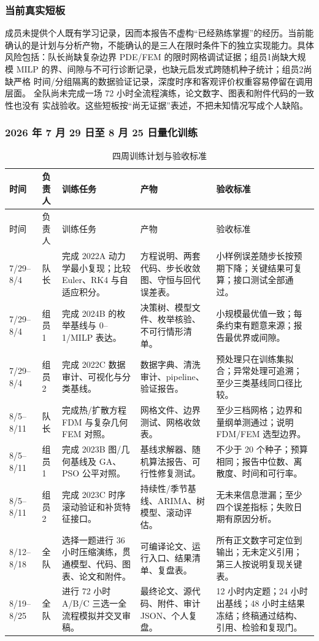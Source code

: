 \documentclass[UTF8,a4paper,12pt]{ctexart}
\begin{document}
\subsubsection{当前真实短板}

成员未提供个人既有学习记录，因而本报告不虚构“已经熟练掌握”的经历。当前能
确认的是计划与分析产物，不能确认的是三人在限时条件下的独立实现能力。具体
风险包括：队长尚缺复杂边界 PDE/FEM 的限时网格调试证据；组员1尚缺大规模
MILP 的界、间隙与不可行诊断记录，也缺元启发式跨随机种子统计；组员2尚缺严格
时间/分组隔离的数据验证记录，深度时序和客观评价权重容易停留在调用层面。
全队尚未完成一场 72 小时全流程演练，论文数字、图表和附件代码的一致性也没有
实战验收。这些短板按“尚无证据”表述，不把未知情况写成个人缺陷。

\subsubsection{2026 年 7 月 29 日至 8 月 25 日量化训练}

\begin{longtable}{p{1.4cm}p{1.55cm}p{3.1cm}p{4.6cm}p{3.4cm}}
\caption{四周训练计划与验收标准}\label{tab:four-weeks}\\
\toprule
时间 & 负责人 & 训练任务 & 产物 & 验收标准\\
\midrule
\endfirsthead
\toprule
时间 & 负责人 & 训练任务 & 产物 & 验收标准\\
\midrule
\endhead
7/29--8/4 & 队长 & 完成 2022A 动力学最小复现；比较 Euler、RK4 与自适应积分。 & 方程说明、两套代码、步长收敛图、守恒与回代误差表。 & 小样例误差随步长按预期下降；关键结果可复算；接口测试全部通过。\\
7/29--8/4 & 组员1 & 完成 2024B 的枚举基线与 0--1/MILP 表达。 & 决策树、模型文件、枚举核验、不可行情形清单。 & 小规模最优值一致；每条约束有题意来源；报告最优界或间隙。\\
7/29--8/4 & 组员2 & 完成 2022C 数据审计、可视化与分类基线。 & 数据字典、清洗审计、pipeline、验证报告。 & 预处理只在训练集拟合；异常处理可追溯；至少三类基线同口径比较。\\
8/5--8/11 & 队长 & 完成热/扩散方程 FDM 与复杂几何 FEM 对照。 & 网格文件、边界测试、网格收敛表。 & 至少三档网格；边界和量纲单测通过；说明 FDM/FEM 选型边界。\\
8/5--8/11 & 组员1 & 完成 2023B 图/几何基线及 GA、PSO 公平对照。 & 基线求解器、随机算法报告、可行性修复测试。 & 不少于 20 个种子；预算相同；报告中位数、离散度、时间和可行率。\\
8/5--8/11 & 组员2 & 完成 2023C 时序滚动验证和补货特征接口。 & 持续性/季节基线、ARIMA、树模型、滚动评估。 & 无未来信息泄漏；至少四个误差指标；失败日期有原因分析。\\
8/12--8/18 & 全队 & 选择一题进行 36 小时压缩演练，贯通模型、代码、图表、论文和附件。 & 可编译论文、运行入口、结果清单、复盘表。 & 所有正文数字可定位到输出；无未定义引用；第三人按说明复现关键表。\\
8/19--8/25 & 全队 & 进行 72 小时 A/B/C 三选一全流程模拟并交叉审稿。 & 最终论文、源代码、附件、审计 JSON、个人复盘。 & 12 小时内定题；24 小时出基线；48 小时主结果冻结；终稿通过结构、引用、检验和复现门。\\
\bottomrule
\end{longtable}
\end{document}
